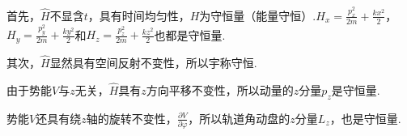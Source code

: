 \solution 首先，$\hat{H}$不显含$t$，具有时间均匀性，$H$为守恒量（能量守恒）.$H_{x}=\frac{p_{x}^{2}}{2m}+\frac{kx^{2}}{2}$，$H_{y}=\frac{p_{y}^{2}}{2m}+\frac{ky^{2}}{2}$和$H_{z}=\frac{p_{z}^{2}}{2m}+\frac{kz^{2}}{2}$也都是守恒量.

其次，$\hat{H}$显然具有空间反射不变性，所以宇称守恒.

由于势能$V$与$z$无关，$\hat{H}$具有$z$方向平移不变性，所以动量的$z$分量$p_{z}$是守恒量.

势能$V$还具有绕$z$轴的旋转不变性，$\frac{\partial V}{\partial\varphi}$，所以轨道角动盘的$z$分量$L_{z}$，也是守恒量.






